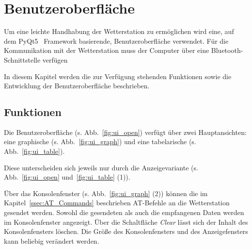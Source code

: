 \pagebreak
\section{Benutzeroberfläche}\label{sec:benutzeroberflaeche}
Um eine leichte Handhabung der Wetterstation zu ermöglichen wird eine, auf dem PyQt5~\cite{pyqt5} Framework basierende, Benutzeroberfläche verwendet. Für die Kommunikation mit der Wetterstation muss der Computer über eine Bluetooth-Schnittstelle verfügen

In diesem Kapitel werden die zur Verfügung stehenden Funktionen sowie die Entwicklung der Benutzeroberfläche beschrieben.

\subsection{Funktionen}\label{sec:bo_funktionen}
Die Benutzeroberfläche (s. Abb.~\ref{fig:ui_open}) verfügt über zwei Hauptansichten: eine graphische (s. Abb.~\ref{fig:ui_graph}) und eine tabelarische (s. Abb.~\ref{fig:ui_table}).

Diese unterscheiden sich jeweils nur durch die Anzeigevariante (s. Abb.~\ref{fig:ui_open} und~\ref{fig:ui_table} (1)).

Über das Konsolenfenster (s. Abb.~\ref{fig:ui_graph} (2)) können die im Kapitel~\ref{ssec:AT_Commands} beschrieben AT-Befehle an die Wetterstation gesendet werden. Sowohl die gesendeten als auch die empfangenen Daten werden im Konsolenfenster angezeigt. Über die Schaltfläche \emph{Clear} lässt sich der Inhalt des Konsolenfensters löschen. Die Größe des Konsolenfensters und des Anzeigefensters kann beliebig verändert werden.

